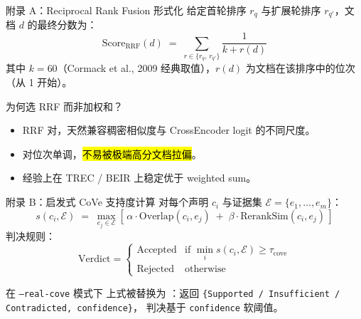 \begin{frame}{附录 A：Reciprocal Rank Fusion 形式化}
  \footnotesize
  给定首轮排序 $r_q$ 与扩展轮排序 $r_{q'}$，文档 $d$ 的最终分数为：
  \[
    \text{Score}_{\text{RRF}}(d) \;=\; \sum_{r \in \{r_q,\, r_{q'}\}} \frac{1}{k + r(d)}
  \]
  其中 $k = 60$（Cormack et al., 2009 经典取值），$r(d)$ 为文档在该排序中的位次（从 1 开始）。

  \begin{block}{为何选 RRF 而非加权和？}
    \begin{itemize}
      \item RRF 对，天然兼容稠密相似度与 CrossEncoder logit 的不同尺度。
      \item 对位次单调，\hl{不易被极端高分文档拉偏}。
      \item 经验上在 TREC / BEIR 上稳定优于 weighted sum。
    \end{itemize}
  \end{block}
\end{frame}

\begin{frame}{附录 B：启发式 CoVe 支持度计算}
  \footnotesize
  对每个声明 $c_i$ 与证据集 $\mathcal{E} = \{e_1, \ldots, e_m\}$：
  \[
    s(c_i, \mathcal{E}) \;=\; \max_{e_j \in \mathcal{E}}
      \left[\, \alpha \cdot \text{Overlap}(c_i, e_j) \;+\; \beta \cdot \text{RerankSim}(c_i, e_j) \,\right]
  \]
  判决规则：
  \[
    \text{Verdict} =
    \begin{cases}
      \text{Accepted} & \text{if } \min_i s(c_i, \mathcal{E}) \ge \tau_{\text{cove}} \\
      \text{Rejected} & \text{otherwise}
    \end{cases}
  \]

  \begin{block}{在 \texttt{--real-cove} 模式下}
    \footnotesize
    上式被替换为 ：返回 \texttt{\{Supported / Insufficient / Contradicted, confidence\}}，
    判决基于 \texttt{confidence} 软阈值。
  \end{block}
\end{frame}


